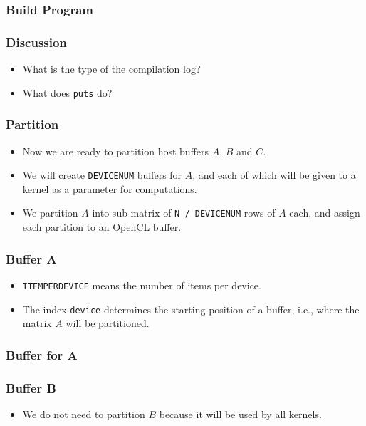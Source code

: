 \documentclass{beamer}
\begin{document}
\begin{frame}
  \frametitle{Build Program}
\end{frame}

\begin{frame}
  \frametitle{Discussion}
  \begin{itemize}
    \item What is the type of the compilation log? 
    \item What does {\tt puts} do?
  \end{itemize}
\end{frame}

\begin{frame}
  \frametitle{Partition}
  \begin{itemize}
    \item Now we are ready to partition host buffers $A$, $B$ and $C$.
    \item We will create {\tt DEVICENUM} buffers for $A$, and each of
      which will be given to a kernel as a parameter for computations.
    \item We partition $A$ into sub-matrix of {\tt N / DEVICENUM} rows
      of $A$ each, and assign each partition to an OpenCL buffer.
  \end{itemize}
\end{frame}

\begin{frame}
  \frametitle{Buffer A}
  \begin{itemize}
    \item {\tt ITEMPERDEVICE} means the number of items per device.
    \item The index {\tt device} determines the starting position of a
      buffer, i.e., where the matrix $A$ will be partitioned.
  \end{itemize}
\end{frame}

\begin{frame}
  \frametitle{Buffer for A}
\end{frame}

\begin{frame}
  \frametitle{Buffer B}
  \begin{itemize}
    \item We do not need to partition $B$ because it will be used by
      all kernels.
  \end{itemize}
\end{frame}
\end{document}
